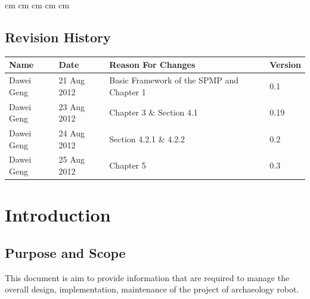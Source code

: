 \documentclass[11pt, a4paper]{report}
\begin{document}
 cm
 cm
 cm
 cm
 cm

\tableofcontents






\clearpage
\section*{Revision History}
\begin{tabular}{| l | l | l | l | }
\hline
Name      		&	Date        	&	Reason For Changes                  	  	&	Version     	\\ \hline
Dawei Geng      & 	21 Aug 2012    	& 	Basic Framework of the SPMP and Chapter 1 	&	0.1             \\ \hline
Dawei Geng      & 	23 Aug 2012    	& 	Chapter 3 \& Section 4.1 				    &	0.19			\\ \hline
Dawei Geng      &	24 Aug 2012     &	Section 4.2.1 \& 4.2.2                 		&	0.2 	     	\\ \hline
Dawei Geng     	&	25 Aug 2012     &	Chapter 5                  	  				&	0.3		    	\\ \hline






\end{tabular}
\clearpage


\chapter{Introduction}

\section{Purpose and Scope}
This document is aim to provide information that are required to manage the overall design, implementation, maintenance of the project of archaeology robot. 
\end{document}
